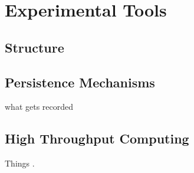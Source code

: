 
\section{Experimental Tools}\label{method:tools}

\subsection{Structure}\label{method:tools:struc}

\subsection{Persistence Mechanisms}\label{method:tools:hdf5}

what gets recorded

\subsection{High Throughput Computing}\label{method:tools:htc}

Things \cite{bui_work_2011}.
